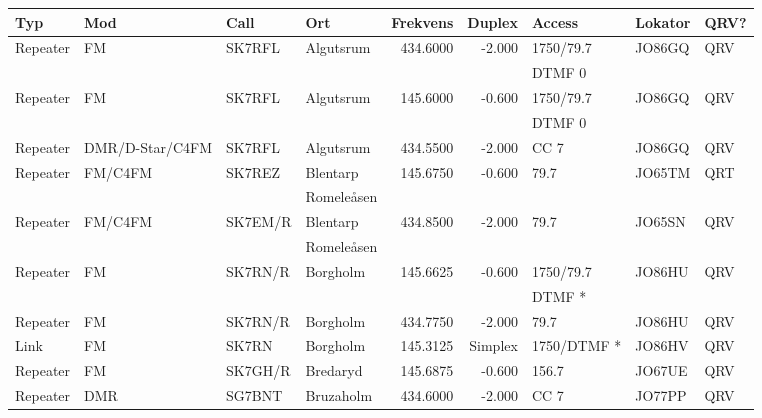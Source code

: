 \begin{longtable}{llllrrlll}
\bf Typ  & \bf Mod         & \bf Call & \bf Ort      & \bf Frekvens & \bf Duplex & \bf Access   & \bf Lokator & \bf QRV? \\ \hline
Repeater & FM              & SK7RFL   & Algutsrum    & 434.6000     & -2.000     & 1750/79.7    & JO86GQ      & QRV      \\
         &                 &          &              &              &            & DTMF 0       &             &          \\
Repeater & FM              & SK7RFL   & Algutsrum    & 145.6000     & -0.600     & 1750/79.7    & JO86GQ      & QRV      \\
         &                 &          &              &              &            & DTMF 0       &             &          \\
Repeater & DMR/D-Star/C4FM & SK7RFL   & Algutsrum    & 434.5500     & -2.000     & CC 7         & JO86GQ      & QRV      \\
Repeater & FM/C4FM         & SK7REZ   & Blentarp     & 145.6750     & -0.600     & 79.7         & JO65TM      & QRT      \\
         &                 &          & Romeleåsen   &              &            &              &             &          \\
Repeater & FM/C4FM         & SK7EM/R  & Blentarp     & 434.8500     & -2.000     & 79.7         & JO65SN      & QRV      \\
         &                 &          & Romeleåsen   &              &            &              &             &          \\
Repeater & FM              & SK7RN/R  & Borgholm     & 145.6625     & -0.600     & 1750/79.7    & JO86HU      & QRV      \\
         &                 &          &              &              &            & DTMF *       &             &          \\
Repeater & FM              & SK7RN/R  & Borgholm     & 434.7750     & -2.000     & 79.7         & JO86HU      & QRV      \\
Link     & FM              & SK7RN    & Borgholm     & 145.3125     & Simplex    & 1750/DTMF *  & JO86HV      & QRV      \\
Repeater & FM              & SK7GH/R  & Bredaryd     & 145.6875     & -0.600     & 156.7        & JO67UE      & QRV      \\
Repeater & DMR             & SG7BNT   & Bruzaholm    & 434.6000     & -2.000     & CC 7         & JO77PP      & QRV      \\

\end{longtable}
